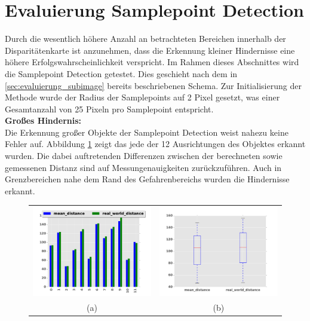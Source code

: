 \section{Evaluierung Samplepoint Detection}
\label{sec:evaluierung_samplepoint}

\noindent
Durch die wesentlich höhere Anzahl an betrachteten Bereichen innerhalb der Disparitätenkarte ist anzunehmen, dass die Erkennung kleiner Hindernisse eine höhere Erfolgswahrscheinlichkeit verspricht. Im Rahmen dieses Abschnittes wird die Samplepoint Detection getestet. Dies geschieht nach dem in \ref{sec:evaluierung_subimage} bereits beschriebenen Schema. Zur Initialisierung der Methode wurde der Radius der Samplepoints auf 2 Pixel gesetzt, was einer Gesamtanzahl von 25 Pixeln pro Samplepoint entspricht.\\

\noindent
\textbf{Großes Hindernis:}\\
Die Erkennung großer Objekte der Samplepoint Detection weist nahezu keine Fehler auf. Abbildung \ref{fig:sample_eval_big} zeigt das jede der 12 Ausrichtungen des Objektes erkannt wurden. Die dabei auftretenden Differenzen zwischen der berechneten sowie gemessenen Distanz sind auf Messungenauigkeiten zurückzuführen. Auch in Grenzbereichen nahe dem Rand des Gefahrenbereichs wurden die Hindernisse erkannt. 

\begin{figure}[h]
	\centering
	\begin{tabular}{cc}
	\includegraphics[width=7cm]{img/evaluation/diagrams/sample_big_bar}&
	\includegraphics[width=7cm]{img/evaluation/diagrams/sample_big_box}\\
	 (a) & (b)
	\end{tabular}
	\caption{}
    \label{fig:sample_eval_big}
\end{figure}

